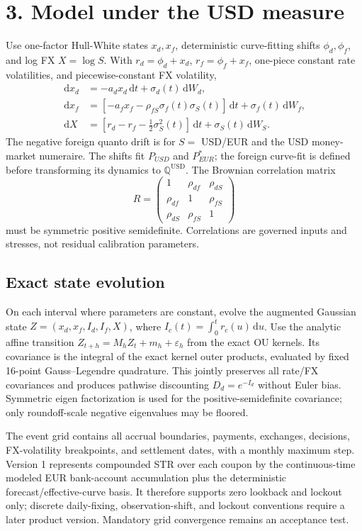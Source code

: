 \documentclass[9pt,letterpaper]{extarticle}
\newcommand{\Qd}{\mathbb{Q}^{\mathrm{USD}}}
\newcommand{\dd}{\,\mathrm{d}}
\begin{document}
\newpage
\section{3. Model under the USD measure}

Use one-factor Hull-White states $x_d,x_f$, deterministic curve-fitting shifts $\phi_d,\phi_f$, and log FX $X=\log S$. With $r_d=\phi_d+x_d$, $r_f=\phi_f+x_f$, one-piece constant rate volatilities, and piecewise-constant FX volatility,
\begin{align}
 \dd x_d&=-a_dx_d\dd t+\sigma_d(t)\dd W_d,\\
 \dd x_f&=\left[-a_fx_f-\rho_{fS}\sigma_f(t)\sigma_S(t)\right]\dd t
             +\sigma_f(t)\dd W_f,\\
 \dd X&=\left[r_d-r_f-\tfrac12\sigma_S^2(t)\right]\dd t+\sigma_S(t)\dd W_S.
\end{align}
The negative foreign quanto drift is for $S=$ USD/EUR and the USD money-market numeraire. The shifts fit $P_{USD}$ and $P_{EUR}^{*}$; the foreign curve-fit is defined before transforming its dynamics to $\Qd$. The Brownian correlation matrix
\[
 R=\begin{pmatrix}1&\rho_{df}&\rho_{dS}\\\rho_{df}&1&\rho_{fS}\\
 \rho_{dS}&\rho_{fS}&1\end{pmatrix}
\]
must be symmetric positive semidefinite. Correlations are governed inputs and stresses, not residual calibration parameters.

\subsection{Exact state evolution}

On each interval where parameters are constant, evolve the augmented Gaussian state
$Z=(x_d,x_f,I_d,I_f,X)$, where $I_c(t)=\int_0^t r_c(u)\dd u$. Use the analytic affine transition $Z_{t+h}=M_hZ_t+m_h+\varepsilon_h$ from the exact OU kernels. Its covariance is the integral of the exact kernel outer products, evaluated by fixed 16-point Gauss--Legendre quadrature. This jointly preserves all rate/FX covariances and produces pathwise discounting $D_d=e^{-I_d}$ without Euler bias. Symmetric eigen factorization is used for the positive-semidefinite covariance; only roundoff-scale negative eigenvalues may be floored.

The event grid contains all accrual boundaries, payments, exchanges, decisions, FX-volatility breakpoints, and settlement dates, with a monthly maximum step. Version 1 represents compounded \texteuro STR over each coupon by the continuous-time modeled EUR bank-account accumulation plus the deterministic forecast/effective-curve basis. It therefore supports zero lookback and lockout only; discrete daily-fixing, observation-shift, and lockout conventions require a later product version. Mandatory grid convergence remains an acceptance test.
\end{document}
